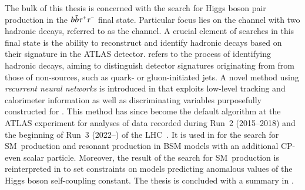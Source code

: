 The bulk of this thesis is concerned with the search for Higgs boson pair
production in the $b\bar{b}\tau^{+} \tau^{-}$ final state. Particular focus lies on the
channel with two hadronic \tauleptonC decays, referred to as the \hadhad channel.
A crucial element of searches in this final state is the ability to reconstruct
and identify hadronic \tauleptonC decays based on their signature in the ATLAS
detector. \emph{\Tauid} refers to the process of identifying hadronic \tauleptonC
decays, aiming to distinguish detector signatures originating from \tauhad from
those of non-\tauhad sources, such as quark- or gluon-initiated jets. A novel
\tauid method using \emph{recurrent neural networks} is introduced in
 that exploits low-level tracking and calorimeter information
as well as discriminating variables purposefully constructed for \tauid. This
method has since become the default \tauid algorithm at the ATLAS experiment for
analyses of data recorded during Run~2 (2015--2018) and the beginning of Run~3
(2022--) of the LHC~\cite{ATL-PHYS-PUB-2019-033,ATL-PHYS-PUB-2022-044}. It is
used in  for the search for SM~\HH production and resonant \HH
production in BSM models with an additional CP-even scalar particle. Moreover,
the result of the search for SM~\HH production is reinterpreted in
 to set constraints on models predicting anomalous
values of the Higgs boson self-coupling constant. The thesis is concluded with a
summary in .


